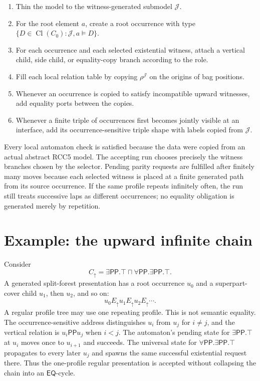 \documentclass[11pt]{article}
\newcommand{\EQ}{\mathsf{EQ}}
\newcommand{\PP}{\mathsf{PP}}
\newcommand{\Cl}{\operatorname{Cl}}
\begin{document}
\begin{enumerate}[label=(C\arabic*)]
\item Thin the model to the witness-generated submodel $\mathcal J$.
\item For the root element $a$, create a root occurrence with type $\{D\in\Cl(C_0):\mathcal J,a\models D\}$.
\item For each occurrence and each selected existential witness, attach a vertical child, side child, or equality-copy branch according to the role.
\item Fill each local relation table by copying $\rho^{\mathcal J}$ on the origins of bag positions.
\item Whenever an occurrence is copied to satisfy incompatible upward witnesses, add equality ports between the copies.
\item Whenever a finite triple of occurrences first becomes jointly visible at an interface, add its occurrence-sensitive triple shape with labels copied from $\mathcal J$.
\end{enumerate}

Every local automaton check is satisfied because the data were copied from an actual abstract RCC5 model.  The accepting run chooses precisely the witness branches chosen by the selector.  Pending parity requests are fulfilled after finitely many moves because each selected witness is placed at a finite generated path from its source occurrence.  If the same profile repeats infinitely often, the run still treats successive laps as different occurrences; no equality obligation is generated merely by repetition.

\section{Example: the upward infinite chain}

Consider
\[
  C_{\uparrow}=\exists\PP.\top\sqcap\forall\PP.\exists\PP.\top.
\]
A generated split-forest presentation has a root occurrence $u_0$ and a superpart-cover child $u_1$, then $u_2$, and so on:
\[
  u_0 E_\uparrow u_1 E_\uparrow u_2 E_\uparrow\cdots .
\]
A regular profile tree may use one repeating profile.  This is not semantic equality.  The occurrence-sensitive address distinguishes $u_i$ from $u_j$ for $i\ne j$, and the vertical relation is $u_i\PP u_j$ when $i<j$.  The automaton's pending state for $\exists\PP.\top$ at $u_i$ moves once to $u_{i+1}$ and succeeds.  The universal state for $\forall\PP.\exists\PP.\top$ propagates to every later $u_j$ and spawns the same successful existential request there.  Thus the one-profile regular presentation is accepted without collapsing the chain into an $\EQ$-cycle.
\end{document}
